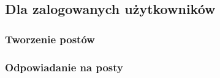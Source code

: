\documentclass{article}
\begin{document}
\subsection{Dla zalogowanych użytkowników}
\subsubsection{Tworzenie postów}
\subsubsection{Odpowiadanie na posty}
\end{document}
